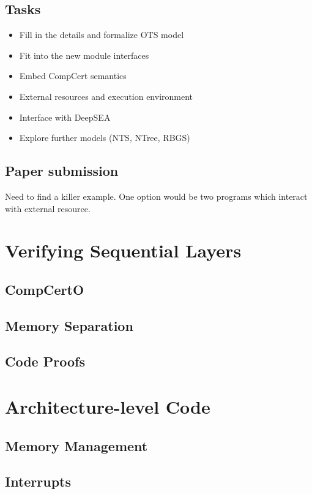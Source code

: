 \documentclass{article}
\begin{document}
\subsection{Tasks}

\begin{itemize}
\item Fill in the details and formalize OTS model
\item Fit into the new module interfaces
\item Embed CompCert semantics
\item External resources and execution environment
\item Interface with DeepSEA
\item Explore further models (NTS, NTree, RBGS)
\end{itemize}

\subsection{Paper submission}

Need to find a killer example.
One option would be two programs which interact with
external resource.

\newpage

\section{Verifying Sequential Layers}

\subsection{CompCertO}
\subsection{Memory Separation}
\subsection{Code Proofs}

\section{Architecture-level Code}
\subsection{Memory Management}
\subsection{Interrupts}
\end{document}
